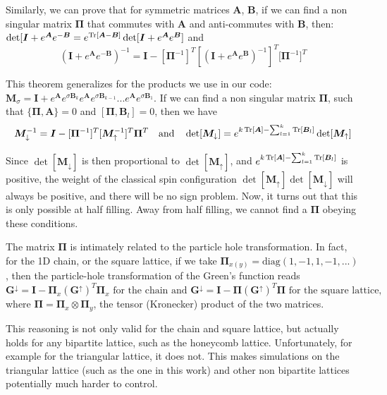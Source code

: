 Similarly, we can prove that for symmetric matrices $\bm A$, $\bm B$, if we can find a non singular matrix $\bm \Pi$ that commutes with $\bm A$ and anti-commutes with $\bm B$, then:  $\det[ \bm I + e^{\bm A} e^{-\bm B} = e^{ \operatorname{Tr} [ \bm A - \bm B ] } \det [ \bm I + e^{\bm A} e^{\bm B} ]$ and
\begin{equation}
(\bm I + e^{\bm A} e^{-\bm B} )^{-1} = \bm I - [\bm \Pi^{-1}]^T [ ( \bm I + e^{\bm A} e^{\bm B} )^{-1} ]^T \bm [\bm \Pi^{-1} ]^T
\end{equation}

This theorem generalizes for the products we use in our code: $\bm M_\sigma = \bm I + e^{\bm A} e^{\sigma \bm B_k} e^{\bm A} e^{\sigma \bm B_{k-1}} ... e^{\bm A} e^{\sigma \bm B_1}$.
If we can find a non singular matrix $\bm \Pi$, such that $\{\bm \Pi, \bm A \} = 0$ and $[ \bm \Pi, \bm B_l] = 0$, then we have
\begin{equation}
\bm M_\downarrow^{-1} = \bm I -[ \bm \Pi^{-1}]^T [\bm M_\uparrow^{-1} ]^T \bm \Pi^T \quad \text{and} \quad \det [ \bm M_\downarrow ] = e^{k \operatorname{Tr} [ \bm A ] - \sum_{l = 1}^k \operatorname{Tr} [ \bm B_l] } \det [ \bm M_\uparrow ]
\end{equation}

Since $\det [ \bm M_\downarrow ] $ is then proportional to $\det [ \bm M_\uparrow ]$, and $e^{k \operatorname{Tr} [ \bm A ] - \sum_{l = 1}^k \operatorname{Tr} [ \bm B_l] }$ is positive, the weight of the classical spin configuration $\det [ \bm M_\uparrow ] \det [ \bm M_\downarrow ] $ will always be positive, and there will be no sign problem.
Now, it turns out that this is only possible at half filling.
Away from half filling, we cannot find a $\bm \Pi$ obeying these conditions.

The matrix $\bm \Pi$ is intimately related to the particle hole transformation.
In fact, for the \acs{1D} chain, or the square lattice, if we take $\bm \Pi_{x (y) } = \text{diag} ( 1, -1, 1, -1, ...)$, then the particle-hole transformation of the Green's function reads
\begin{equation}
\bm G^\downarrow = \bm I - \bm \Pi_x (\bm G^\uparrow)^T \bm \Pi_x \text{  for the chain} \,\, \text{and} \,\, \bm G^\downarrow = \bm I - \bm \Pi (\bm G^\uparrow)^T \bm \Pi \text{  for the square lattice} ,
\end{equation}
where $\bm \Pi = \bm \Pi_x \otimes \bm \Pi_y$, the tensor (Kronecker) product of the two matrices.

This reasoning is not only valid for the chain and square lattice, but actually holds for any bipartite lattice, such as the honeycomb lattice.
Unfortunately, for example for the triangular lattice, it does not.
This makes simulations on the triangular lattice (such as the one in this work) and other non bipartite lattices potentially much harder to control.